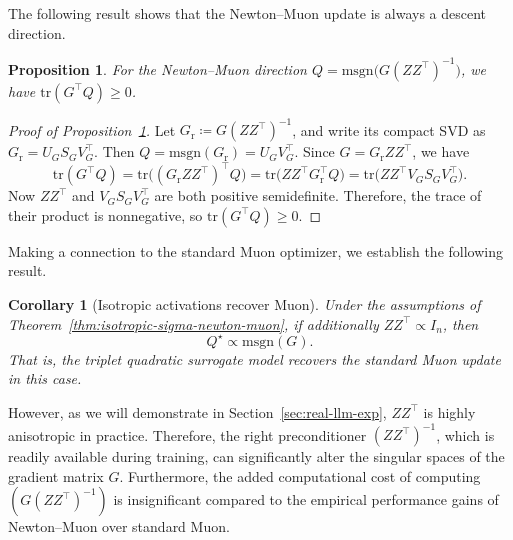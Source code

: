\documentclass[11pt]{article}
\newtheorem{proposition}{Proposition}
\newtheorem{corollary}{Corollary}
\begin{document}
The following result shows that the Newton--Muon update is always a descent direction.

\begin{proposition}\label{prop:Newton--Muon-descent}
For the Newton--Muon direction $Q =\mathrm{msgn}\big(G(ZZ^\top)^{-1}\big)$, we have $\mathrm{tr}(G^\top Q) \ge 0$.
\end{proposition}

\begin{proof}[Proof of Proposition~\ref{prop:Newton--Muon-descent}]
Let ${G}_{\mathrm{r}} \coloneqq G(ZZ^\top)^{-1}$, and write its compact SVD as ${G}_{\mathrm{r}}={U}_{G}{S}_{G}{V}_{G}^\top$. Then $Q=\mathrm{msgn}({G}_{\mathrm{r}})={U}_{G}{V}_{G}^\top$. Since $G={G}_{\mathrm{r}}ZZ^\top$, we have
\[
\mathrm{tr}(G^\top Q)
=
\mathrm{tr}\big(( {G}_{\mathrm{r}}ZZ^\top )^\top Q\big)
=
\mathrm{tr}\big(ZZ^\top {G}_{\mathrm{r}}^\top Q\big)
=
\mathrm{tr}\big(ZZ^\top {V}_{G}{S}_{G}{V}_{G}^\top\big).
\]
Now $ZZ^\top$ and ${V}_{G}{S}_{G}{V}_{G}^\top$ are both positive semidefinite. Therefore, the trace of their product is nonnegative, so $\mathrm{tr}(G^\top Q) \ge 0$.
\end{proof}

Making a connection to the standard Muon optimizer, we establish the following result.

\begin{corollary}[Isotropic activations recover Muon]
\label{cor:isotropic-aa-muon}
Under the assumptions of Theorem~\ref{thm:isotropic-sigma-newton-muon}, if additionally
${Z}{Z}^\top \propto {I}_n$, then
\[
{Q}^\star  \propto  \mathrm{msgn}({G}).
\]
That is, the triplet quadratic surrogate model recovers the standard Muon update in this case.
\end{corollary}

However, as we will demonstrate in Section~\ref{sec:real-llm-exp}, ${Z}{Z}^\top$ is highly anisotropic in practice. Therefore, the right preconditioner $({Z}{Z}^\top)^{-1}$, which is readily available during training, can significantly alter the singular spaces of the gradient matrix $G$. Furthermore, the added computational cost of computing $(G(ZZ^\top)^{-1})$ is insignificant compared to the empirical performance gains of Newton--Muon over standard Muon.
\end{document}
